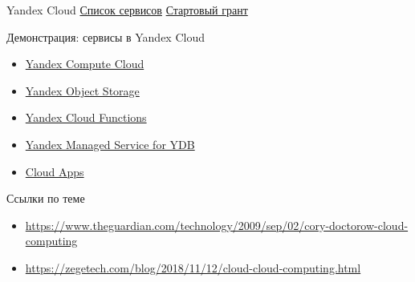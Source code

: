 \documentclass[aspectratio=169]{beamer}
\begin{document}
    \begin{frame}{Yandex Cloud}
        \href{https://yandex.cloud/ru/docs/overview/concepts/services}{Список сервисов}
        \href{https://yandex.cloud/ru/docs/getting-started/usage-grant}{Стартовый грант}
    \end{frame}

    \begin{frame}{Демонстрация: сервисы в Yandex Cloud}
        \begin{itemize}
            \item \href{https://yandex.cloud/ru/docs/compute/}{Yandex Compute Cloud}
            \item \href{https://yandex.cloud/ru/docs/storage/}{Yandex Object Storage}
            \item \href{https://yandex.cloud/ru/docs/functions/}{Yandex Cloud Functions}
            \item \href{https://yandex.cloud/ru/docs/ydb/}{Yandex Managed Service for YDB}
            \item \href{https://yandex.cloud/ru/docs/cloud-apps/}{Cloud Apps}
        \end{itemize}
    \end{frame}

    \begin{frame}{Ссылки по теме}
        \begin{itemize}
            \item \url{https://www.theguardian.com/technology/2009/sep/02/cory-doctorow-cloud-computing}
            \item \url{https://zegetech.com/blog/2018/11/12/cloud-cloud-computing.html}
        \end{itemize}
    \end{frame}
\end{document}

